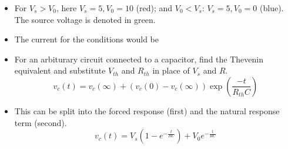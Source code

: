 \documentclass{article}
\begin{document}
\begin{itemize}
    \item For $V_s>V_0$, here $V_s=5, V_0=10$ (red); and $V_0<V_s$: $V_s=5, V_0=0$ (blue). The source voltage is denoted in green.
    \begin{center}
    \end{center}
    \item The current for the conditions would be 
    \begin{center}
    \end{center}
    \item For an arbiturary circuit connected to a capacitor, find the Thevenin equivalent and substitute $V_{th}$ and $R_{th}$ in place of $V_s$ and $R$.
    \begin{equation}
        v_c(t)=v_c(\infty)+(v_c(0)-v_c(\infty))\exp(\frac{-t}{R_{th}C})\label{150}
    \end{equation}
    \item This can be split into the forced response (first) and the natural response term (second).
    \begin{equation}
        v_c(t)=V_s(1-e^{-\frac{t}{RC}})+V_0e^{-\frac{t}{RC}}
    \end{equation}
\end{itemize}
\end{document}
